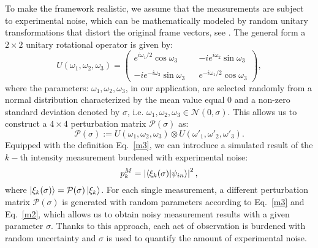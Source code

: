 \documentclass[aps,pra,reprint,groupedaddress,showkeys]{revtex4-1}
\renewcommand{\eqref}[1]{Eq.~\ref{#1}}
\begin{document}
To make the framework realistic, we assume that the measurements are subject to experimental noise, which can be mathematically modeled by random unitary transformations that distort the original frame vectors, see \cite{Lohani2020}. The general form a $2 \times 2$ unitary rotational operator is given by:
\begin{equation}\label{m2}
U (\omega_1, \omega_2, \omega_3) = \begin{pmatrix} e ^{i \omega_1/ 2 } \cos \omega_3 & & -i e^{i \omega_2} \sin \omega_3 \\ & & \\ - i e^{-i \omega_2} \sin \omega_3 & & e^{- i \omega_1/2} \cos \omega_3  \end{pmatrix},
\end{equation}
where the parameters: $\omega_1, \omega_2, \omega_3$, in our application, are selected randomly from a normal distribution characterized by the mean value equal $0$ and a non-zero standard deviation denoted by $\sigma$, i.e. $\omega_1, \omega_2, \omega_3 \in \mathcal{N}(0,\sigma)$. This allows us to construct a $4\times4$ perturbation matrix $\mathcal{P} (\sigma)$ as:
\begin{equation}\label{m3}
\mathcal{P} (\sigma) := U (\omega_1, \omega_2, \omega_3) \otimes U (\omega'_1, \omega'_2, \omega'_3).
\end{equation}
Equipped with the definition \eqref{m3}, we can introduce a simulated result of the $k-$th intensity measurement burdened with experimental noise:
\begin{equation}\label{m4}
p^{M}_k = \left|\braket{ \xi_k (\sigma) | \psi_{in}}\right|^2,
\end{equation}
where $\ket{\xi_k (\sigma)} = \mathcal{P}(\sigma) \ket{\xi_k}$. For each single measurement, a different perturbation matrix $\mathcal{P} (\sigma)$ is generated with random parameters according to \eqref{m3} and \eqref{m2}, which allows us to obtain noisy measurement results with a given parameter $\sigma$. Thanks to this approach, each act of observation is burdened with random uncertainty and $\sigma$ is used to quantify the amount of experimental noise.
\end{document}
